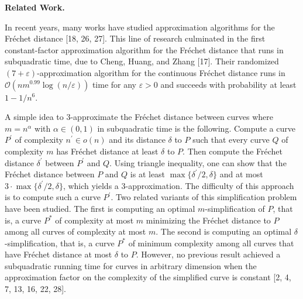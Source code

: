 \documentclass[10pt,a4paper]{article}
\begin{document}
\par
\par
\par\medskip\noindent\textbf{Related Work.}\par
In recent years, many works have studied approximation algorithms for the Fréchet distance [18, 26, 27]. This line of research culminated in the first constant-factor approximation algorithm for the Fréchet distance that runs in subquadratic time, due to Cheng, Huang, and Zhang [17]. Their randomized $(7+\varepsilon)$-approximation algorithm for the continuous Fréchet distance runs in $\mathcal{O}(nm^{0.99}\log(n/\varepsilon))$ time for any $\varepsilon>0$ and succeeds with probability at least $1-1/n^{6}$.
\par
\par
A simple idea to $3$-approximate the Fréchet distance between curves where $m=n^{\alpha}$ with $\alpha\in(0,1)$ in subquadratic time is the following. Compute a curve $P^{\prime}$ of complexity $n^{\prime}\in o(n)$ and its distance $\delta$ to $P$ such that every curve $Q$ of complexity $m$ has Fréchet distance at least $\delta$ to $P$. Then compute the Fréchet distance $\delta^{\prime}$ between $P^{\prime}$ and $Q$. Using triangle inequality, one can show that the Fréchet distance between $P$ and $Q$ is at least $\max\{\delta^{\prime}/2,\delta\}$ and at most $3\cdot\max\{\delta^{\prime}/2,\delta\}$, which yields a $3$-approximation. The difficulty of this approach is to compute such a curve $P^{\prime}$. Two related variants of this simplification problem have been studied. The first is computing an optimal $m$-simplification of $P$, that is, a curve $P^{*}$ of complexity at most $m$ minimizing the Fréchet distance to $P$ among all curves of complexity at most $m$. The second is computing an optimal $\delta$-simplification, that is, a curve $P^{*}$ of minimum complexity among all curves that have Fréchet distance at most $\delta$ to $P$. However, no previous result achieved a subquadratic running time for curves in arbitrary dimension when the approximation factor on the complexity of the simplified curve is constant [2, 4, 7, 13, 16, 22, 28].
\par
\par
\end{document}
